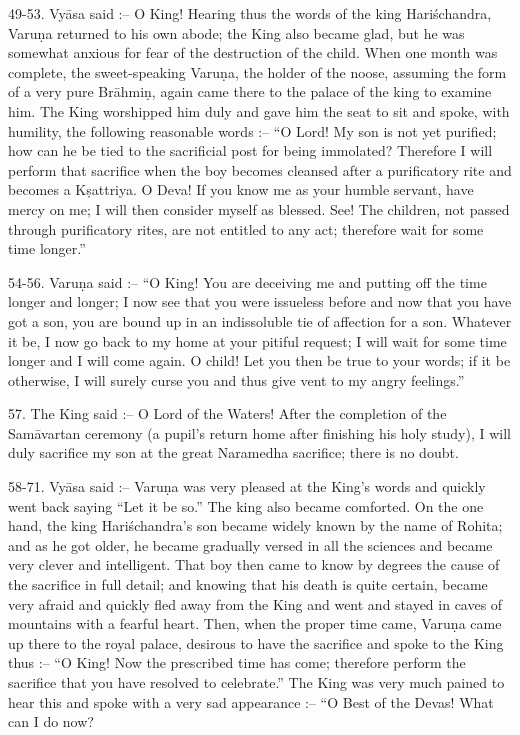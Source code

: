 49-53. Vy\=asa said :-- O King! Hearing thus the words of the king Hari\'schandra, Varu\d{n}a returned to his own abode; the King also became glad, but he was somewhat anxious for fear of the destruction of the child. When one month was complete, the sweet-speaking Varu\d{n}a, the holder of the noose, assuming the form of a very pure Br\=ahmi\d{n}, again came there to the palace of the king to examine him. The King worshipped him duly and gave him the seat to sit and spoke, with humility, the following reasonable words :-- ``O Lord! My son is not yet purified; how can he be tied to the sacrificial post for being immolated? Therefore I will perform that sacrifice when the boy becomes cleansed after a purificatory rite and becomes a K\d{s}attriya. O Deva! If you know me as your humble servant, have mercy on me; I will then consider myself as blessed. See! The children, not passed through purificatory rites, are not entitled to any act; therefore wait for some time longer.''

54-56. Varu\d{n}a said :-- ``O King! You are deceiving me and putting off the time longer and longer; I now see that you were issueless before and now that you have got a son, you are bound up in an indissoluble tie of affection for a son. Whatever it be, I now go back to my home at your pitiful request; I will wait for some time longer and I will come again. O child! Let you then be true to your words; if it be otherwise, I will surely curse you and thus give vent to my angry feelings.''

57. The King said :-- O Lord of the Waters! After the completion of the Sam\=avartan ceremony (a pupil's return home after finishing his holy study), I will duly sacrifice my son at the great Naramedha sacrifice; there is no doubt.

58-71. Vy\=asa said :-- Varu\d{n}a was very pleased at the King's words and quickly went back saying ``Let it be so.'' The king also became comforted. On the one hand, the king Hari\'schandra's son became widely known by the name of Rohita; and as he got older, he became gradually versed in all the sciences and became very clever and intelligent. That boy then came to know by degrees the cause of the sacrifice in full detail; and knowing that his death is quite certain, became very afraid and quickly fled away from the King and went and stayed in caves of mountains with a fearful heart. Then, when the proper time came, Varu\d{n}a came up there to the royal palace, desirous to have the sacrifice and spoke to the King thus :-- ``O King! Now the prescribed time has come; therefore perform the sacrifice that you have resolved to celebrate.'' The King was very much pained to hear this and spoke with a very sad appearance :-- ``O Best of the Devas! What can I do now?

